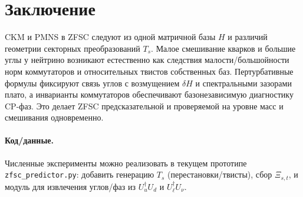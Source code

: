 \documentclass[12pt,a4paper]{article}
\begin{document}
\section*{Заключение}
CKM и PMNS в ZFSC следуют из одной матричной базы $H$ и различий геометрии секторных преобразований $T_s$. Малое смешивание кварков и большие углы у нейтрино возникают естественно как следствия малости/большойности норм коммутаторов и относительных твистов собственных баз. Пертурбативные формулы фиксируют связь углов с возмущением $\delta H$ и спектральными зазорами плато, а инварианты коммутаторов обеспечивают базонезависимую диагностику CP-фаз. Это делает ZFSC предсказательной и проверяемой на уровне масс и смешивания одновременно.

\paragraph{Код/данные.} Численные эксперименты можно реализовать в текущем прототипе \texttt{zfsc\_predictor.py}: добавить генерацию $T_s$ (перестановки/твисты), сбор $\Xi_{s,t}$, и модуль для извлечения углов/фаз из $U_u^\dagger U_d$ и $U_\ell^\dagger U_\nu$.
\end{document}
